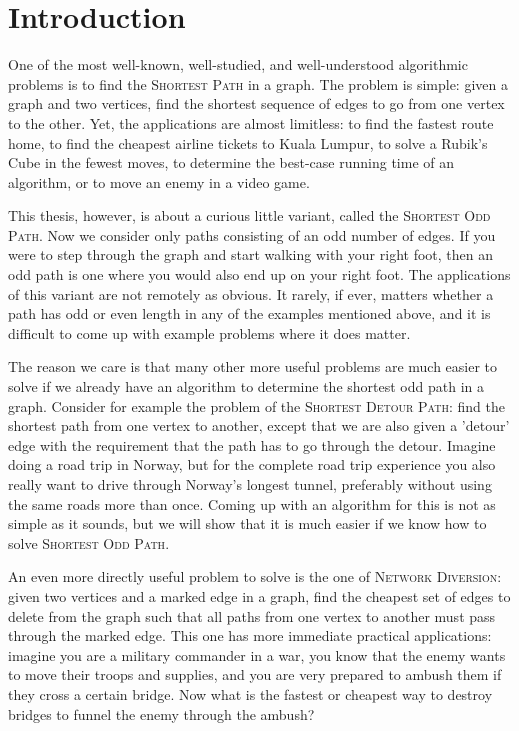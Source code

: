 \chapter{Introduction}

One of the most well-known, well-studied, and well-understood algorithmic problems is to find the \textsc{Shortest Path} in a graph. The problem is simple: given a graph and two vertices, find the shortest sequence of edges to go from one vertex to the other. Yet, the applications are almost limitless: to find the fastest route home, to find the cheapest airline tickets to Kuala Lumpur, to solve a Rubik's Cube in the fewest moves, to determine the best-case running time of an algorithm, or to move an enemy in a video game.

This thesis, however, is about a curious little variant, called the \textsc{Shortest Odd Path}. Now we consider only paths consisting of an odd number of edges. If you were to step through the graph and start walking with your right foot, then an odd path is one where you would also end up on your right foot. The applications of this variant are not remotely as obvious. It rarely, if ever, matters whether a path has odd or even length in any of the examples mentioned above, and it is difficult to come up with example problems where it does matter.

The reason we care is that many other more useful problems are much easier to solve if we already have an algorithm to determine the shortest odd path in a graph. Consider for example the problem of the \textsc{Shortest Detour Path}: find the shortest path from one vertex to another, except that we are also given a 'detour' edge with the requirement that the path has to go through the detour. Imagine doing a road trip in Norway, but for the complete road trip experience you also really want to drive through Norway's longest tunnel, preferably without using the same roads more than once. Coming up with an algorithm for this is not as simple as it sounds, but we will show that it is much easier if we know how to solve \textsc{Shortest Odd Path}.

An even more directly useful problem to solve is the one of \textsc{Network Diversion}: given two vertices and a marked edge in a graph, find the cheapest set of edges to delete from the graph such that all paths from one vertex to another must pass through the marked edge. This one has more immediate practical applications: imagine you are a military commander in a war, you know that the enemy wants to move their troops and supplies, and you are very prepared to ambush them if they cross a certain bridge. Now what is the fastest or cheapest way to destroy bridges to funnel the enemy through the ambush?

